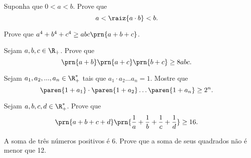 \begin{exercise}
  Suponha que $0 < a < b$. Prove que
$$a < \raiz{a \cdot b} < b.$$
\end{exercise}

\begin{exercise}
Prove que $a^4 +b^4 +c^4 \geq abc \prn{a+b+c}$.
\end{exercise}

\begin{exercise}
Sejam $a, b, c \in \R_+$. Prove que $$\prn {a+b} \prn {a+c}
\prn {b+c} \geq 8abc.$$
\end{exercise}

\begin{exercise}
  Sejam $a_1, a_2, ..., a_n \in \R^\ast_+$ tais que $a_1 \cdot a_2 \dots a_n = 1$. Mostre que $$\paren{1 + a_1 } \cdot \paren{1 + a_2} \dots \paren{1 + a_n } \geq 2^n.$$
\end{exercise}

\begin{exercise}
Sejam $a, b, c, d \in \R_+^*$. Prove que $$\prn {a+b+c+d}
\prn {\frac 1 a + \frac 1 b + \frac 1 c + \frac 1 d} \geq 16.$$
\end{exercise}


\begin{exercise}
A soma de três números positivos é 6. Prove que a soma de seus
quadrados não é menor que 12.
\end{exercise}
